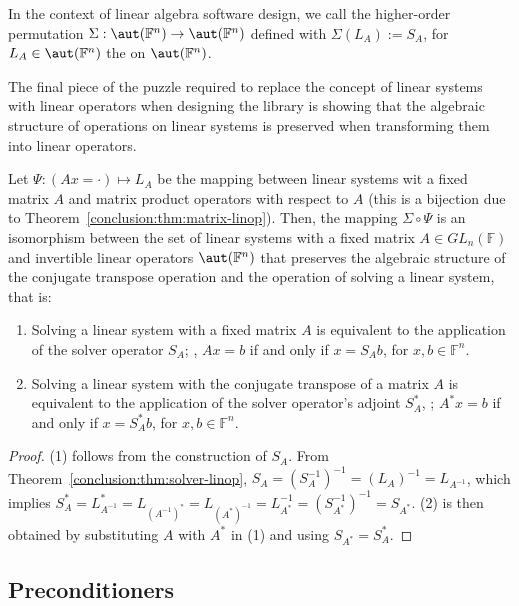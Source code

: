 \begin{definition}
\label{conclusion:def:solver-factory}
In the context of linear algebra software design, we call the higher-order
permutation $\Sigma : \aut(\mathbb{F}^n) \rightarrow \aut(\mathbb{F}^n)$ defined
with $\Sigma(L_A) := S_A$, for $L_A \in \aut(\mathbb{F}^n)$ the  on $\aut(\mathbb{F}^n)$.
\end{definition}

The final piece of the puzzle required to replace the concept of linear systems
with linear operators when designing the library is showing that the algebraic
structure of operations on linear systems is preserved when transforming them
into linear operators.

\begin{corollary}
\label{conclusion:cor:solver-linop}
Let $\Psi : (Ax = \cdot) \mapsto L_A$ be the mapping between linear systems wit
a fixed matrix $A$ and matrix product operators with respect to $A$ (this is a
bijection due to Theorem~\ref{conclusion:thm:matrix-linop}).
Then, the mapping $\Sigma \circ \Psi$ is an isomorphism between the set of
linear systems with a fixed matrix $A \in GL_n(\mathbb{F})$ and invertible
linear operators $\aut(\mathbb{F}^n)$ that preserves the algebraic structure of
the conjugate transpose operation and the operation of solving a linear system,
that is:
\begin{enumerate}
\item Solving a linear system with a fixed matrix $A$ is equivalent to the
application of the solver operator $S_A$; \ie, $Ax = b$ if and only if $x =
S_Ab$, for $x, b \in \mathbb{F}^n$.
\item Solving a linear system with the conjugate transpose of a matrix $A$ is
equivalent to the application of the solver operator's adjoint $S_A^*$, \ie;
$A^*x = b$ if and only if $x = S_A^*b$, for $x, b \in \mathbb{F}^n$.
\end{enumerate}
\end{corollary}

\begin{proof}
(1) follows from the construction of $S_A$. From
Theorem~\ref{conclusion:thm:solver-linop}, $S_A = (S_A^{-1})^{-1} = (L_A)^{-1} =
L_{A^{-1}}$, which implies $S_A^* = L_{A^{-1}}^* = L_{(A^{-1})^*} =
L_{(A^*)^{-1}} = L_{A^*}^{-1} = (S_{A^*}^{-1})^{-1} = S_{A^*}$. (2) is then
obtained by substituting $A$ with $A^*$ in (1) and using $S_{A^*} = S_A^*$.
\end{proof}

\subsection{Preconditioners}

